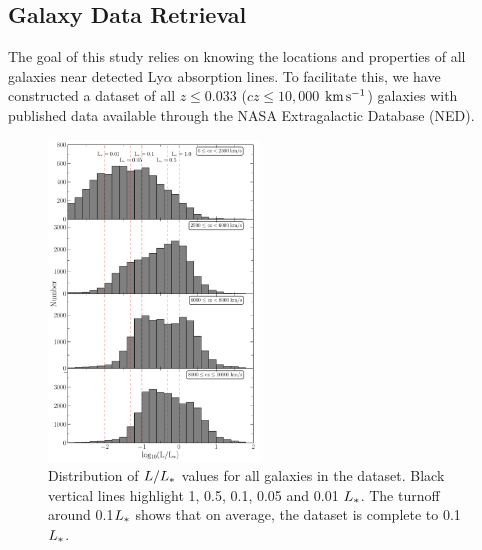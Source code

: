 \documentclass[iop]{emulateapj-rtx4}
\newcommand{\kms}{$\rm km\, s^{-1}$}
\begin{document}
\subsection{Galaxy Data Retrieval}

The goal of this study relies on knowing the locations and properties of all galaxies near detected Ly$\alpha$ absorption lines. To facilitate this, we have constructed a dataset of all $z\leq 0.033$ ($cz\leq 10,000$ \kms) galaxies with published data available through the NASA Extragalactic Database (NED). 

\begin{figure}[ht!]
        \centering
        \vspace{0pt}
        \includegraphics[width=0.50\textwidth]{fig1.pdf}
        \caption{\small{Distribution of $L/L_{\**}$ values for all galaxies in the dataset. Black vertical lines highlight 1, 0.5, 0.1, 0.05 and 0.01 $L_{\**}$. The turnoff around 0.1$L_{\**}$ shows that on average, the dataset is complete to 0.1$L_{\**}$.}}
        \label{completeness}
\end{figure} 
\end{document}
